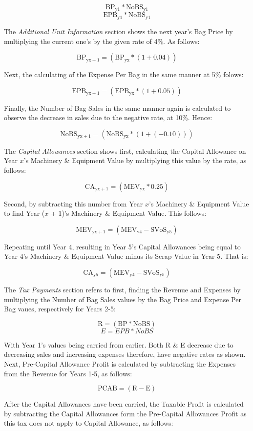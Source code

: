 \documentclass[11pt, english]{article}
\begin{document}
	$$\mathrm{BP_{y1}*NoBS_{y1}}$$ $$\mathrm{EPB_{y1}*NoBS_{y1}}$$

	The \textit{Additional Unit Information} section shows the next year's Bag Price by multiplying the current one's by the given rate of 4\%. As follows:

	$$\mathrm{BP_{yx+1}=(BP_{yx}*(1+0.04))}$$

	Next, the calculating of the Expense Per Bag in the same manner at 5\% folows:

	$$\mathrm{EPB_{yx+1}=(EPB_{yx}*(1+0.05))}$$

	Finally, the Number of Bag Sales in the same manner again is calculated to observe the decrease in sales due to the negative rate, at 10\%. Hence: 

	$$\mathrm{NoBS_{yx+1}=(NoBS_{yx}*(1+(-0.10)))}$$

	The \textit{Capital Allowances} section shows first, calculating the Capital Allowance on Year $x$'s Machinery \& Equipment Value by multiplying this value by the rate, as follows:

	$$\mathrm{CA_{yx+1}=(MEV_{yx}*0.25)}$$

	Second, by subtracting this number from Year $x$'s Machinery \& Equipment Value to find Year ($x$ + 1)'s Machinery \& Equipment Value. This follows: 

	$$\mathrm{MEV_{yx+1}=(MEV_{y4}-SVoS_{y5})}$$

	Repeating until Year 4, resulting in Year 5's Capital Allowances being equal to Year 4's Machinery \& Equipment Value minus its Scrap Value in Year 5. That is:

	$$\mathrm{CA_{y5}=(MEV_{y4}-SVoS_{y5})}$$

	The \textit{Tax Payments} section refers to first, finding the Revenue and Expenses by multiplying the Number of Bag Sales values by the Bag Price and Expense Per Bag vaues, respectively for Years 2-5:

	$$\mathrm{R=(BP*NoBS)}$$ $$\mathit{E=EPB*NoBS}$$

	With Year 1's values being carried from earlier. Both R \& E decrease due to decreasing sales and increasing expenses therefore, have negative rates as shown. Next, Pre-Capital Allowance Profit is calculated by subtracting the Expenses from the Revenue for Years 1-5, as follows:

	$$\mathrm{PCAB=(R-E)}$$

	After the Capital Allowances have been carried, the Taxable Profit is calculated by subtracting the Capital Allowances form the Pre-Capital Allowances Profit as this tax does not apply to Capital Allowance, as follows:
\end{document}
